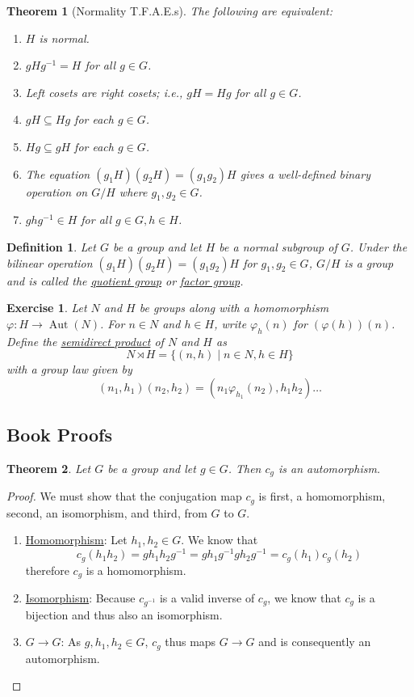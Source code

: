 \documentclass[12pt]{article}
\newtheorem{defn}{Definition}
\newtheorem{thm}{Theorem}
\newtheorem{exer}{Exercise}
\numberwithin{problem}{section} %
\numberwithin{defn}{section} %
\numberwithin{thm}{section} %
\numberwithin{exer}{section} %
\numberwithin{lma}{section} %
\numberwithin{crlly}{section} %
\theoremstyle{remark}  %
\begin{document}
\setcounter{thm}{30}
\begin{thm}[Normality T.F.A.E.s]
    The following are equivalent:
    \begin{enumerate}
        \item $H$ is normal.
        \item $gHg^{-1}=H$ for all $g\in G$.
        \item Left cosets are right cosets; i.e., $gH=Hg$ for all $g\in G$.
        \item $gH \subseteq Hg$ for each $g \in G$.
        \item $Hg \subseteq gH$ for each $g \in G$.
        \item The equation $(g_1H)(g_2H)=(g_1g_2)H$ gives a well-defined binary operation on $G/H$ where $g_1,g_2\in G$.
        \item $ghg^{-1} \in H$ for all $g\in G, h\in H$.
    \end{enumerate}
\end{thm}

\setcounter{defn}{31}
\begin{defn}
    Let $G$ be a group and let $H$ be a normal subgroup of $G$. Under the bilinear operation $(g_1H)(g_2H)=(g_1g_2)H$ for $g_1,g_2\in G$, $G/H$ is a group and is called the \ul{quotient group} or \ul{factor group}.
\end{defn}

\setcounter{exer}{150}
\begin{exer}
    Let $N$ and $H$ be groups along with a homomorphism $\varphi\operatorname{:} H\to \operatorname{Aut}(N)$. For $n\in N$ and $h\in H$, write $\varphi_h(n)$ for $(\varphi(h))(n)$. Define the \ul{semidirect product} of $N$ and $H$ as $$N \rtimes H = \{(n,h) \mid n\in N, h\in H\}$$ with a group law given by $$(n_1,h_1)(n_2,h_2)=(n_1\varphi_{h_1}(n_2),h_1h_2)\dots$$
\end{exer}

\subsection{Book Proofs}
\setcounter{thm}{22}
\begin{thm}
    Let $G$ be a group and let $g \in G$. Then $c_g$ is an automorphism.
\end{thm}
\begin{proof}
    We must show that the conjugation map $c_g$ is first, a homomorphism, second, an isomorphism, and third, from $G$ to $G$.
    \begin{enumerate}
        \item \ul{Homomorphism}: Let $h_1,h_2\in G$. We know that $$c_g(h_1h_2)=gh_1h_2g^{-1}=gh_1g^{-1}gh_2g^{-1}=c_g(h_1)c_g(h_2)$$ therefore $c_g$ is a homomorphism.
        \item \ul{Isomorphism}: Because $c_{g^{-1}}$ is a valid inverse of $c_g$, we know that $c_g$ is a bijection and thus also an isomorphism.
        \item \ul{$G \to G$}: As $g,h_1,h_2\in G$, $c_g$ thus maps $G\to G$ and is consequently an automorphism.
    \end{enumerate}
\end{proof}
\end{document}
